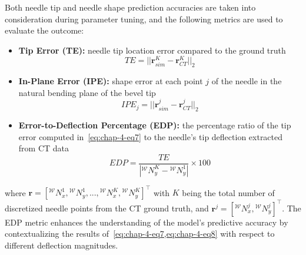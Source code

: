 Both needle tip and needle shape prediction accuracies are taken into consideration during parameter tuning, and the following metrics are used to evaluate the outcome:
\begin{itemize}
\item \textbf{Tip Error (TE):} needle tip location error compared to the ground truth
\begin{equation} \label{eq:chap-4-eq7}
TE = ||\boldsymbol{r}^K_{sim} - \boldsymbol{r}^K_{CT}||_2
\end{equation}
\item \textbf{In-Plane Error (IPE):} shape error at each point $j$ of the needle in the natural bending plane of the bevel tip
\begin{equation} \label{eq:chap-4-eq8}
IPE_j = ||\boldsymbol{r}^j_{sim} - \boldsymbol{r}^j_{CT} ||_2
\end{equation}
\item \textbf{Error-to-Deflection Percentage (EDP):} the percentage ratio of the tip error computed in~\cref{eq:chap-4-eq7} to the needle's tip deflection extracted from CT data
\begin{equation}
EDP = \frac{TE}{|{}^{\mathcal{W}}N^K_y - {}^{\mathcal{W}}N^1_y|} \times 100
\end{equation}
\end{itemize}
where $\boldsymbol{r} = [{}^{\mathcal{W}}N^1_x,  {}^{\mathcal{W}}N^1_y,..., {}^{\mathcal{W}}N^K_x, {}^{\mathcal{W}}N^K_y]^\top$ with $K$ being the total number of discretized needle points from the CT ground truth, and $\boldsymbol{r}^j = [{}^{\mathcal{W}}N^j_x,  {}^{\mathcal{W}}N^j_y]^\top$. The EDP metric enhances the understanding of the model's predictive accuracy by contextualizing the results of~\cref{eq:chap-4-eq7,eq:chap-4-eq8} with respect to different deflection magnitudes.

